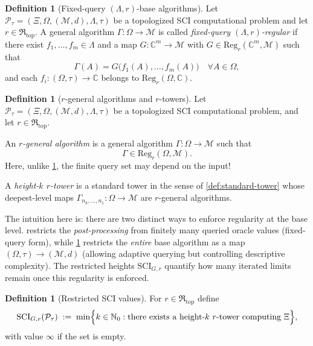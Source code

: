 \documentclass{lmcs} %
\theoremstyle{plain}
\theoremstyle{plain}
\theoremstyle{definition}
\newtheorem{definition}[theorem]{Definition}
\theoremstyle{remark}
\theoremstyle{definition}
\theoremstyle{remark}
\numberwithin{equation}{section}
\newcommand{\C}{\mathbb{C}}
\newcommand{\Reg}{\mathrm{Reg}}
\begin{document}
\begin{definition}[Fixed-query $(\Lambda,r)$-base algorithms]\label{def:fixed-query-base}
Let $\mathcal{P}_\tau=(\Xi,\Omega,(\mathcal{M},d),\Lambda,\tau)$ be a topologized SCI computational problem and let
$r \in \mathfrak{R}_{\mathrm{top}}$.
A general algorithm $\Gamma:\Omega\to \mathcal{M}$ is called \textit{fixed-query $(\Lambda,r)$-regular} if there exist $f_1,\dots,f_m\in\Lambda$ and a map $G:\C^m\to \mathcal{M}$ with $G\in \Reg_r(\mathbb{C}^m,\mathcal M)$ such that
\[
\Gamma(A)=G\bigl(f_1(A),\dots,f_m(A)\bigr)\quad\forall A\in\Omega,
\]
and each $f_i:(\Omega,\tau)\to\C$ belongs to $\Reg_r(\Omega,\mathbb{C})$.
\end{definition}

\begin{definition}[$r$-general algorithms and $r$-towers]\label{def:R-tower}
Let $\mathcal{P}_\tau=(\Xi,\Omega,(\mathcal{M},d),\Lambda,\tau)$ be a topologized SCI computational problem,
and let $r \in \mathfrak{R}_{\mathrm{top}}$.

An \textit{$r$-general algorithm} is a general algorithm $\Gamma:\Omega\to\mathcal{M}$ such that 
\[
\Gamma \in \Reg_r(\Omega,\mathcal M).
\]
Here, unlike \cref{def:fixed-query-base}, the finite query set may depend on the input!

A \textit{height-$k$ $r$-tower} is a standard tower in the sense of \cref{def:standard-tower} whose deepest-level maps $\Gamma_{n_k,\dots,n_1}:\Omega\to\mathcal{M}$ are $r$-general algorithms.
\end{definition}

The intuition here is: there are two distinct ways to enforce regularity at the base level.
 restricts the \textit{post-processing} from finitely many queried oracle values
(fixed-query form), while \cref{def:R-tower} restricts the \textit{entire} base algorithm as a map
$(\Omega,\tau)\to (\mathcal{M},d)$ (allowing adaptive querying but controlling descriptive complexity).
The restricted heights $\mathrm{SCI}_{G,r}$ quantify how many iterated limits remain
once this regularity is enforced.

\begin{definition}[Restricted SCI values]\label{def:SCI-R}
For $r\in\mathfrak{R}_{\mathrm{top}}$ define
\[
\mathrm{SCI}_{G,r}(\mathcal{P}_\tau)
\;:=\;
\min\Bigl\{
k\in\mathbb N_0 :
\text{there exists a height-}k\text{ $r$-tower computing }\Xi
\Bigr\},
\]
with value $\infty$ if the set is empty.
\end{definition}
\end{document}
